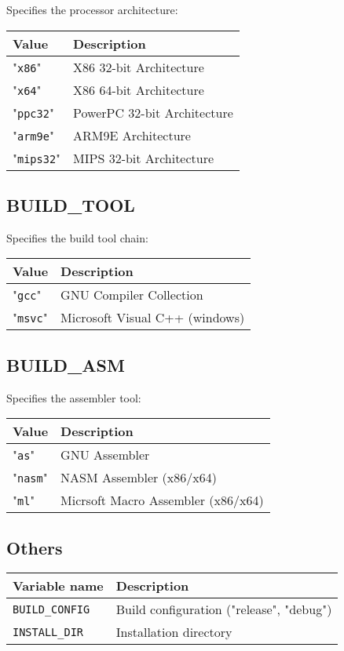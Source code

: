 \documentclass{article}
\newcommand{\var}[1]{{\tt #1}}
\newcommand{\val}[1]{"{\tt #1}"}
\begin{document}
Specifies the processor architecture:

\begin{tabular}{ll}
Value        & Description                 \\
\hline
\val{x86}    & X86 32-bit Architecture     \\
\val{x64}    & X86 64-bit Architecture     \\
\val{ppc32}  & PowerPC 32-bit Architecture \\
\val{arm9e}  & ARM9E Architecture          \\
\val{mips32} & MIPS 32-bit Architecture    \\
\end{tabular}

\subsection{BUILD\_TOOL}

Specifies the build tool chain:

\begin{tabular}{ll}
Value      & Description             \\
\hline
\val{gcc}  & GNU Compiler Collection \\
\val{msvc} & Microsoft Visual C++ (windows) \\
\end{tabular}

\subsection{BUILD\_ASM}

Specifies the assembler tool:

\begin{tabular}{ll}
Value      & Description              \\
\hline
\val{as}   & GNU Assembler            \\
\val{nasm} & NASM Assembler (x86/x64) \\
\val{ml}   & Micrsoft Macro Assembler (x86/x64)\\
\end{tabular}

\subsection{Others}

\begin{tabular}{ll}
Variable name		& Description		\\
\hline
\var{BUILD\_CONFIG}	& Build configuration ("release", "debug") \\
\var{INSTALL\_DIR}	& Installation directory \\
\end{tabular}
\end{document}

